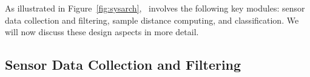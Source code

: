 As illustrated in Figure~\ref{fig:sysarch}, \systemname~involves the following key modules: sensor data collection and filtering, sample distance computing, and classification.
%
%
We will now discuss these design aspects in more detail.
\subsection{Sensor Data Collection and Filtering}

